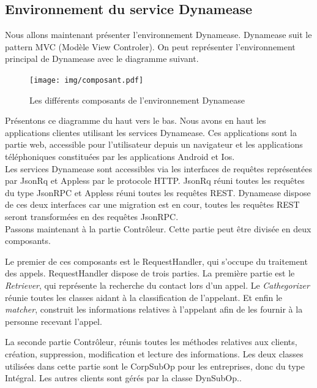 \subsection{Environnement du service Dynamease}

Nous allons maintenant présenter l'environnement Dynamease. Dynamease suit le pattern MVC (Modèle View Controler). On peut représenter l'environnement principal de Dynamease avec le diagramme suivant.

\newpage

\begin{figure}[!h]
	\centering
	\texttt{[image: img/composant.pdf]}
	\caption{\label{composant} Les différents composants de l'environnement Dynamease}
\end{figure}

Présentons ce diagramme du haut vers le bas. Nous avons en haut les applications clientes utilisant les services Dynamease. Ces applications sont la partie web, accessible pour l'utilisateur depuis un navigateur et les applications téléphoniques constituées par les applications Android et Ios.\\

Les services Dynamease sont accessibles via les interfaces de requêtes représentées par JsonRq et Appless par le protocole HTTP. JsonRq réuni toutes les requêtes du type JsonRPC et Appless réuni toutes les requêtes REST. Dynamease dispose de ces deux interfaces car une migration est en cour, toutes les requêtes REST seront transformées en des requêtes JsonRPC.\\

Passons maintenant à la partie Contrôleur. Cette partie peut être divisée en deux composants.

Le premier de ces composants est le RequestHandler, qui s'occupe du traitement des appels. RequestHandler dispose de trois parties. La première partie est le \textit{Retriever}, qui représente la recherche du contact lors d'un appel. Le \textit{Cathegorizer} réunie toutes les classes aidant à la classification de l'appelant. Et enfin le \textit{matcher}, construit les informations relatives à l'appelant afin de les fournir à la personne recevant l'appel.

La seconde partie Contrôleur, réunis toutes les méthodes relatives aux clients, création, suppression, modification et lecture des informations. Les deux classes utilisées dans cette partie sont le CorpSubOp pour les entreprises, donc du type Intégral. Les autres clients sont gérés par la classe DynSubOp..\\


